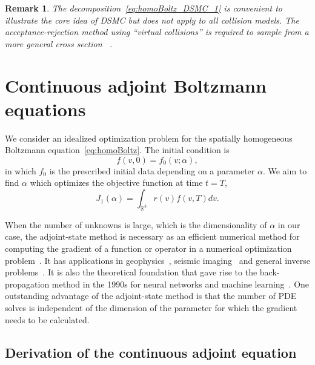 \documentclass[times,final,nopreprintline]{elsarticle}
\newtheorem{remark}{Remark}
\newcommand{\bbR}{\mathbb R} \newcommand{\bbS}{\mathbb S}
\begin{document}
\begin{remark}
The decomposition~\eqref{eq:homoBoltz_DSMC_1} is convenient to illustrate the core idea of DSMC but does not apply to all collision models. The acceptance-rejection method using ``virtual collisions'' is required to sample from a more general cross section ~\cite{caflisch1998monte}.
\end{remark}







\section{Continuous adjoint Boltzmann equations}\label{ContinuousFormulation}
We consider an idealized optimization problem for the spatially homogeneous Boltzmann equation~\eqref{eq:homoBoltz}. 
The initial condition is
\begin{equation}
f(v,0)=f_0(v;\alpha), \label{BoltzmannIC}
\end{equation}
in which $f_0$ is the prescribed initial data depending on a parameter $\alpha$. We aim to find $\alpha$ which optimizes the objective function at time $t=T$,
\begin{equation}\label{eq:OTD_obj}
J_1 (\alpha) = \int_{\bbR^3} r(v) f(v,T) dv.
\end{equation}

When the number of unknowns is large, which is the dimensionality of $\alpha$ in our case, the adjoint-state method is necessary as an efficient numerical method for computing the gradient of a function or operator in a numerical optimization problem~\cite{biegler2003large,cao2003adjoint}. It has applications in geophysics~\cite{chavent1975history}, seismic imaging~\cite{plessix2006review} and general inverse problems~\cite{mcgillivray1990methods}. It is also the theoretical foundation that gave rise to the back-propagation method in the 1990s for neural networks and machine learning~\cite{lecun1988theoretical}.
One outstanding advantage of the adjoint-state method is that the number of PDE solves is independent of the dimension of the parameter for which the gradient needs to be calculated. 

\subsection{Derivation of  the continuous adjoint equation}  %
\end{document}
